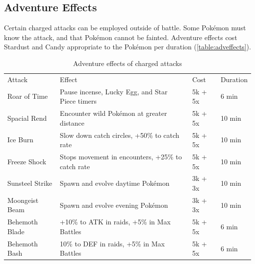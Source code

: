 \subsection{Adventure Effects\label{sec:effects}}
Certain charged attacks can be employed outside of battle.
Some Pokémon must know the attack, and that Pokémon cannot be fainted.
Adventure effects cost Stardust and Candy appropriate to the Pokémon
  per duration (\autoref{table:adveffects}).
\begin{table}
  \centering
  \begin{tabular}{lp{}ll}
    Attack & Effect & Cost & Duration\\
    \Midrule
    Roar of Time & Pause incense, Lucky Egg, and Star Piece timers & 5k + 5x & 6 min\\
    Spacial Rend & Encounter wild Pokémon at greater distance & 5k + 5x & 10 min\\
    Ice Burn & Slow down catch circles, +50\% to catch rate & 5k + 5x & 10 min\\
    Freeze Shock & Stops movement in encounters, +25\% to catch rate & 5k + 5x & 10 min\\
    Sunsteel Strike & Spawn and evolve daytime Pokémon & 3k + 3x & 10 min\\
    Moongeist Beam & Spawn and evolve evening Pokémon & 3k + 3x & 10 min\\
    Behemoth Blade & +10\% to ATK in raids, +5\% in Max Battles & 5k + 5x & 6 min\\
    Behemoth Bash & 10\% to DEF in raids, +5\% in Max Battles & 5k + 5x & 6 min\\
  \end{tabular}
  \caption{Adventure effects of charged attacks\label{table:adveffects}}
\end{table}

